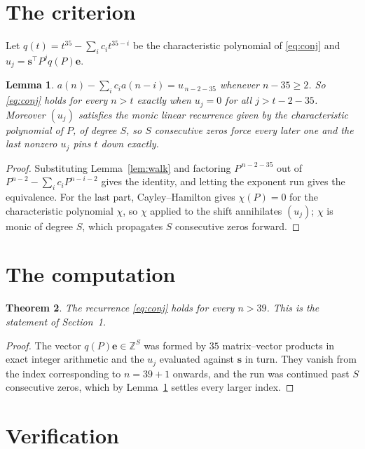 \documentclass[11pt,a4paper]{article}
\theoremstyle{plain}
\newtheorem{theorem}{Theorem}
\newtheorem{lemma}[theorem]{Lemma}
\theoremstyle{definition}
\begin{document}
\section{The criterion}

Let $q(t)=t^{35}-\sum_i c_i t^{35-i}$ be the characteristic polynomial of
\eqref{eq:conj} and $u_j=\mathbf{s}^{\!\top}P^{j}q(P)\mathbf{e}$.

\begin{lemma}\label{lem:crit}
$a(n)-\sum_i c_i a(n-i)=u_{\,n-2-35}$ whenever $n-35\ge2$. So \eqref{eq:conj}
holds for every $n>t$ exactly when $u_j=0$ for all $j>t-2-35$. Moreover $(u_j)$
satisfies the monic linear recurrence given by the characteristic polynomial of $P$, of
degree $S$, so $S$ consecutive zeros force every later one and the last nonzero $u_j$ pins
$t$ down exactly.
\end{lemma}

\begin{proof}
Substituting Lemma~\ref{lem:walk} and factoring $P^{\,n-2-35}$ out of
$P^{n-2}-\sum_i c_i P^{n-i-2}$ gives the identity, and letting the exponent run gives the
equivalence. For the last part, Cayley--Hamilton gives $\chi(P)=0$ for the characteristic
polynomial $\chi$, so $\chi$ applied to the shift annihilates $(u_j)$; $\chi$ is monic of
degree $S$, which propagates $S$ consecutive zeros forward.
\end{proof}

\section{The computation}

\begin{theorem}
The recurrence \eqref{eq:conj} holds for every $n>39$. This is the statement of
Section~1.
\end{theorem}

\begin{proof}
The vector $q(P)\mathbf{e}\in\mathbb{Z}^{S}$ was formed by $35$ matrix--vector
products in exact integer arithmetic and the $u_j$ evaluated against $\mathbf{s}$ in turn.
They vanish from the index corresponding to $n=39+1$ onwards, and the run was continued
past $S$ consecutive zeros, which by Lemma~\ref{lem:crit} settles every larger index.
\end{proof}

\section{Verification}
\end{document}
